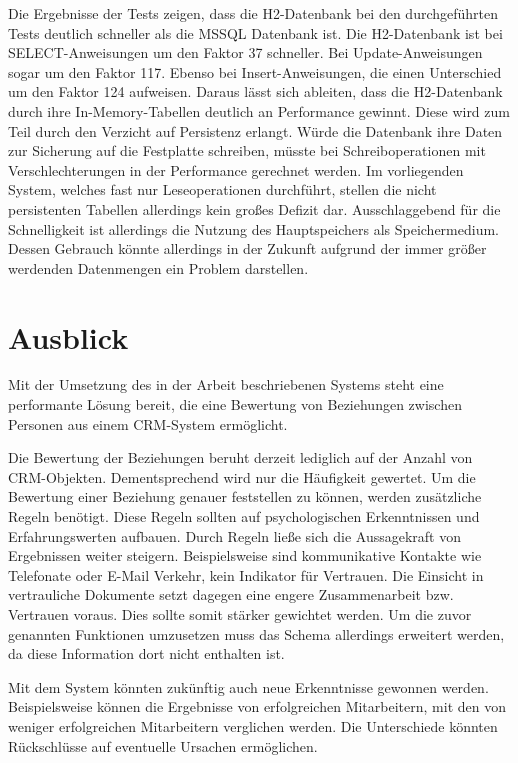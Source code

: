 Die Ergebnisse der Tests zeigen, dass die H2-Datenbank bei den durchgeführten Tests deutlich schneller als die MSSQL Datenbank ist. Die H2-Datenbank ist bei SELECT-Anweisungen um den Faktor 37 schneller. Bei Update-Anweisungen sogar um den Faktor 117. Ebenso bei Insert-Anweisungen, die einen Unterschied um den Faktor 124 aufweisen. Daraus lässt sich ableiten, dass die H2-Datenbank durch ihre In-Memory-Tabellen deutlich an Performance gewinnt. Diese wird zum Teil durch den Verzicht auf Persistenz erlangt. Würde die Datenbank ihre Daten zur Sicherung auf die Festplatte schreiben, müsste bei Schreiboperationen mit Verschlechterungen in der Performance gerechnet werden. Im vorliegenden System, welches fast nur Leseoperationen durchführt, stellen die nicht persistenten Tabellen allerdings kein großes Defizit dar. Ausschlaggebend für die Schnelligkeit ist allerdings die Nutzung des Hauptspeichers als Speichermedium. Dessen Gebrauch könnte allerdings in der Zukunft aufgrund der immer größer werdenden Datenmengen ein Problem darstellen.  

\section{Ausblick}
\label{ch:Ergebnis:sec:Ausblick}

Mit der Umsetzung des in der Arbeit beschriebenen Systems steht eine performante Lösung bereit, die eine Bewertung von Beziehungen zwischen Personen aus einem CRM-System ermöglicht.

Die Bewertung der Beziehungen beruht derzeit lediglich auf der Anzahl von CRM-Objekten. Dementsprechend wird nur die Häufigkeit gewertet. Um die Bewertung einer Beziehung genauer feststellen zu können, werden zusätzliche Regeln benötigt. Diese Regeln sollten auf psychologischen Erkenntnissen und Erfahrungswerten aufbauen. Durch Regeln ließe sich die Aussagekraft von Ergebnissen weiter steigern. Beispielsweise sind kommunikative Kontakte wie Telefonate oder E-Mail Verkehr, kein Indikator für Vertrauen. Die Einsicht in vertrauliche Dokumente setzt dagegen eine engere Zusammenarbeit bzw. Vertrauen voraus. Dies sollte somit stärker gewichtet werden. Um die zuvor genannten Funktionen umzusetzen muss das Schema allerdings erweitert werden, da diese Information dort nicht enthalten ist.

Mit dem System könnten zukünftig auch neue Erkenntnisse gewonnen werden. Beispielsweise können die Ergebnisse von erfolgreichen Mitarbeitern, mit den von weniger erfolgreichen Mitarbeitern verglichen werden. Die Unterschiede könnten Rückschlüsse auf eventuelle Ursachen ermöglichen.

